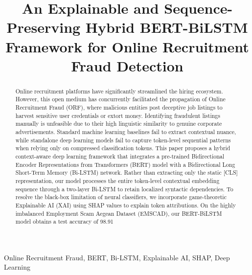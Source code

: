 \documentclass[conference]{IEEEtran}
\begin{document}
\title{An Explainable and Sequence-Preserving Hybrid BERT-BiLSTM Framework for Online Recruitment Fraud Detection}

\author{
}

\maketitle

\begin{abstract}
Online recruitment platforms have significantly streamlined the hiring ecosystem. However, this open medium has concurrently facilitated the propagation of Online Recruitment Fraud (ORF), where malicious entities post deceptive job listings to harvest sensitive user credentials or extort money. Identifying fraudulent listings manually is unfeasible due to their high linguistic similarity to genuine corporate advertisements. Standard machine learning baselines fail to extract contextual nuance, while standalone deep learning models fail to capture token-level sequential patterns when relying only on compressed classification tokens. This paper proposes a hybrid context-aware deep learning framework that integrates a pre-trained Bidirectional Encoder Representations from Transformers (BERT) model with a Bidirectional Long Short-Term Memory (Bi-LSTM) network. Rather than extracting only the static [CLS] representation, our model processes the entire token-level contextual embedding sequence through a two-layer Bi-LSTM to retain localized syntactic dependencies. To resolve the black-box limitation of neural classifiers, we incorporate game-theoretic Explainable AI (XAI) using SHAP values to explain token attributions. On the highly imbalanced Employment Scam Aegean Dataset (EMSCAD), our BERT-BiLSTM model obtains a test accuracy of 98.91%
\end{abstract}

\begin{IEEEkeywords}
Online Recruitment Fraud, BERT, Bi-LSTM, Explainable AI, SHAP, Deep Learning
\end{IEEEkeywords}
\end{document}
